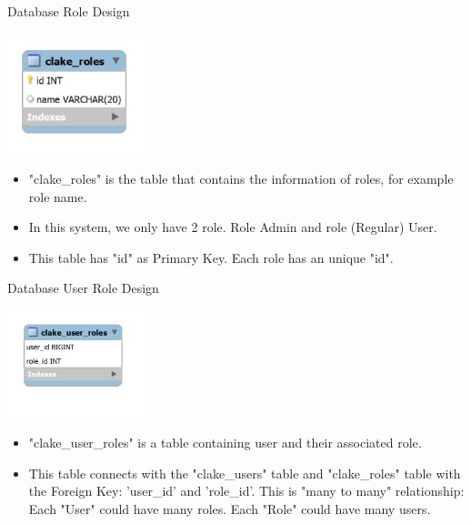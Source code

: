 \begin{table}[H]
  \centering
  \caption{Database Role Design}
  \label{tbl:dbRole}
  \includegraphics[width=0.3\textwidth]{images/DatabaseRoleDesign.PNG}
\end{table}
\begin{itemize}
    \item "clake\_roles" is the table that contains the information of roles, for example role name. 
    \item In this system, we only have 2 role. Role Admin and role (Regular) User.
    \item This table has "id" as Primary Key. Each role has an unique "id". 
\end{itemize}

\begin{table}[H]
  \centering
  \caption{Database User Role Design}
  \label{tbl:dbUserRole}
  \includegraphics[width=0.3\textwidth]{images/DatabaseUserRoleDesign.PNG}
\end{table}
\begin{itemize}
    \item "clake\_user\_roles" is a table containing user and their associated role.
    \item This table connects with the "clake\_users" table and "clake\_roles" table with the Foreign Key: 'user\_id' and 'role\_id'. This is "many to many" relationship: Each "User" could have many roles. Each "Role" could have many users.  
\end{itemize}

